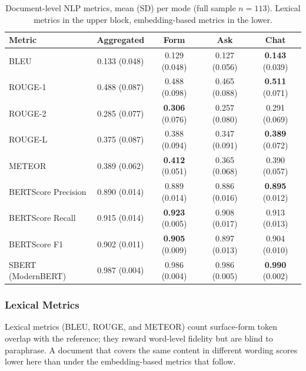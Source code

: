 \begin{table}[htbp]
\centering
\caption{Document-level NLP metrics, mean (SD) per mode (full
sample $n = 113$). Lexical metrics in the upper block,
embedding-based metrics in the lower.}
\label{tab:nlp-doc-overview}
\small
\begin{tabular}{@{}l c c c c@{}}
\toprule
Metric & Aggregated & Form & Ask & Chat \\
\midrule
BLEU                & 0.133 (0.048) & 0.129 (0.048) & 0.127 (0.056) & \textbf{0.143} (0.039) \\
ROUGE-1             & 0.488 (0.087) & 0.488 (0.098) & 0.465 (0.088) & \textbf{0.511} (0.071) \\
ROUGE-2             & 0.285 (0.077) & \textbf{0.306} (0.076) & 0.257 (0.080) & 0.291 (0.069) \\
ROUGE-L             & 0.375 (0.087) & 0.388 (0.094) & 0.347 (0.091) & \textbf{0.389} (0.072) \\
METEOR              & 0.389 (0.062) & \textbf{0.412} (0.051) & 0.365 (0.068) & 0.390 (0.057) \\
\midrule
BERTScore Precision & 0.890 (0.014) & 0.889 (0.014) & 0.886 (0.016) & \textbf{0.895} (0.012) \\
BERTScore Recall    & 0.915 (0.014) & \textbf{0.923} (0.005) & 0.908 (0.017) & 0.913 (0.013) \\
BERTScore F1        & 0.902 (0.011) & \textbf{0.905} (0.009) & 0.897 (0.013) & 0.904 (0.010) \\
SBERT (ModernBERT)  & 0.987 (0.004) & 0.986 (0.004) & 0.986 (0.005) & \textbf{0.990} (0.002) \\
\bottomrule
\end{tabular}
\end{table}

\subsubsection{Lexical Metrics}
\label{ssec:nlp-doc-lexical}

Lexical metrics (BLEU, ROUGE, and METEOR) count surface-form token
overlap with the reference; they reward word-level fidelity but
are blind to paraphrase. A document that covers the same content
in different wording scores lower here than under the
embedding-based metrics that follow.

